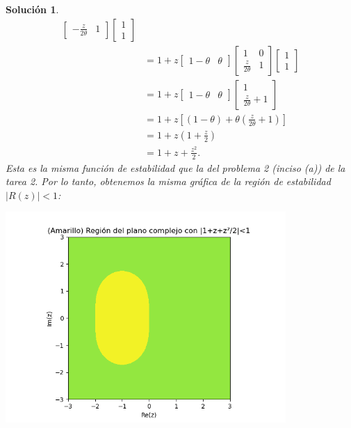 \documentclass[11pt]{article}
\newtheorem*{sol}{Solución}
\begin{document}
\begin{sol}
\begin{align}
\begin{bmatrix}
        -\frac{z}{2\theta} & 1
      \end{bmatrix}
      \begin{bmatrix}
        1 \\ 1
      \end{bmatrix}
    \\
    &= 1 + z
      \begin{bmatrix}
        1-\theta & \theta
      \end{bmatrix}
      \begin{bmatrix}
        1 & 0 \\
        \frac{z}{2\theta} & 1
      \end{bmatrix}
      \begin{bmatrix}
        1 \\ 1
      \end{bmatrix}
    \\
    &= 1 + z
      \begin{bmatrix}
        1-\theta & \theta
      \end{bmatrix}
      \begin{bmatrix}
        1 \\
        \frac{z}{2\theta} + 1
      \end{bmatrix}
    \\
    &= 1 + z[(1-\theta)+\theta(\tfrac{z}{2\theta}+1)] \\
    &= 1 + z(1+\tfrac{z}{2}) \\
    &= 1 + z+\frac{z^{2}}{2}
  .\end{align}
  Esta es la misma función de estabilidad que la del problema 2
  (inciso (a)) de la tarea 2. Por lo tanto, obtenemos la misma
  gráfica de la región de estabilidad $|R(z)|<1$:
   \begin{center}
  \includegraphics[width=0.8\textwidth]{img/jaac_tarea2_ejercicio2a}
  \end{center}
\end{sol}
\end{document}
